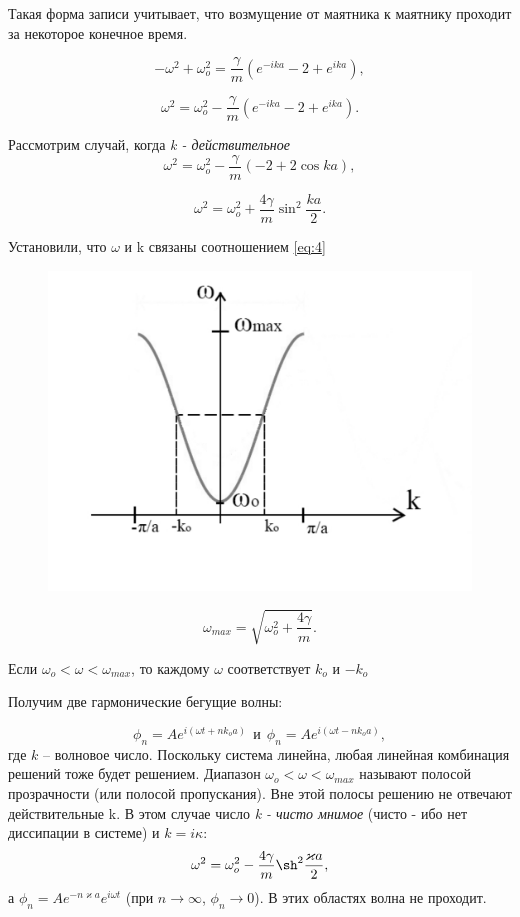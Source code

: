 Такая форма записи учитывает, что возмущение от маятника к маятнику проходит за некоторое конечное время.

\begin{equation*}
	-\omega^2+\omega_o^2=\frac{\gamma}{m}(e^{-ika}-2+e^{ika}),
\end{equation*}

\begin{equation}
	\omega^2=\omega_o^2-\frac{\gamma}{m}(e^{-ika}-2+e^{ika}).
	\label{eq:3}
\end{equation}

Рассмотрим случай, когда \textit{k - действительное}
\begin{equation*}
	\omega^2=\omega_o^2-\frac{\gamma}{m}(-2+2\cos{ka}),
\end{equation*}

\begin{equation}
	\omega^2=\omega_o^2+\frac{4\gamma}{m}\sin^2{\frac{ka}{2}}.
	\label{eq:4}
\end{equation}

Установили, что $\omega$ и k связаны соотношением \eqref{eq:4}

\begin{figure}[H]
	\centering
	\includegraphics[width=0.5\linewidth]{fig/fig2.pdf}   
\end{figure}

\begin{equation*}
	\omega_{max}=\sqrt{\omega_o^2+\frac{4\gamma}{m}}.
\end{equation*}

Если $\omega_o < \omega < \omega_{max}$, то каждому $\omega$ соответствует $k_o$ и $-k_o$

Получим две гармонические бегущие волны:

\begin{equation*}
	\phi_n=A e^{i(\omega t+nk_oa)} ~~\text{и} ~~\phi_n=A e^{i(\omega t-nk_oa)},
\end{equation*}
где $k$ -- волновое число. Поскольку система линейна, любая линейная комбинация решений тоже будет решением. Диапазон $\omega_o < \omega < \omega_{max}$ называют полосой прозрачности (или полосой пропускания). Вне этой полосы решению не отвечают действительные k. В этом случае число \textit{k - чисто мнимое} (чисто - ибо нет диссипации в системе) и $k=i\kappa$:
\begin{equation}
	\omega^2=\omega_o^2-\frac{4\gamma}{m}\sh^2{\frac{\varkappa a}{2}},
	\label{eq:5}
\end{equation}
а $\phi_n=A e^{-n\varkappa a} e^{i\omega t}$ (при $n\rightarrow \infty$, $\phi_n \rightarrow 0$). В этих областях волна не проходит. 

